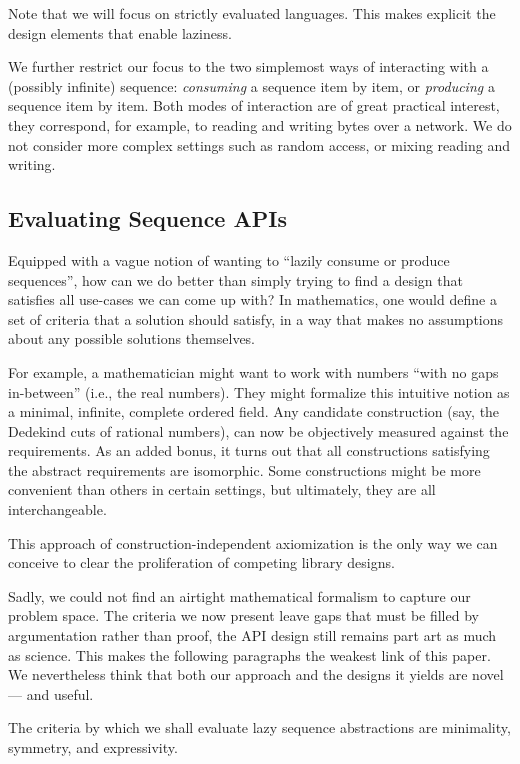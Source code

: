 \documentclass[sigplan,screen,10pt,anonymous,review]{acmart}
\begin{document}
Note that we will focus on strictly evaluated languages. This makes explicit the design elements that enable laziness.

We further restrict our focus to the two simplemost ways of interacting with a (possibly infinite) sequence: \textit{consuming} a sequence item by item, or \textit{producing} a sequence item by item. Both modes of interaction are of great practical interest, they correspond, for example, to reading and writing bytes over a network. We do not consider more complex settings such as random access, or mixing reading and writing.

\subsection{Evaluating Sequence APIs}

Equipped with a vague notion of wanting to ``lazily consume or produce sequences'', how can we do better than simply trying to find a design that satisfies all use-cases we can come up with? In mathematics, one would define a set of criteria that a solution should satisfy, in a way that makes no assumptions about any possible solutions themselves.

For example, a mathematician might want to work with numbers ``with no gaps in-between'' (i.e., the real numbers). They might formalize this intuitive notion as a minimal, infinite, complete ordered field. Any candidate construction (say, the Dedekind cuts of rational numbers), can now be objectively measured against the requirements. As an added bonus, it turns out that all constructions satisfying the abstract requirements are isomorphic. Some constructions might be more convenient than others in certain settings, but ultimately, they are all interchangeable.

This approach of construction-independent axiomization is the only way we can conceive to clear the proliferation of competing library designs.

Sadly, we could not find an airtight mathematical formalism to capture our problem space. The criteria we now present leave gaps that must be filled by argumentation rather than proof, the API design still remains part art as much as science. This makes the following paragraphs the weakest link of this paper. We nevertheless think that both our approach and the designs it yields are novel --- and useful.

The criteria by which we shall evaluate lazy sequence abstractions are minimality, symmetry, and expressivity.
\end{document}
